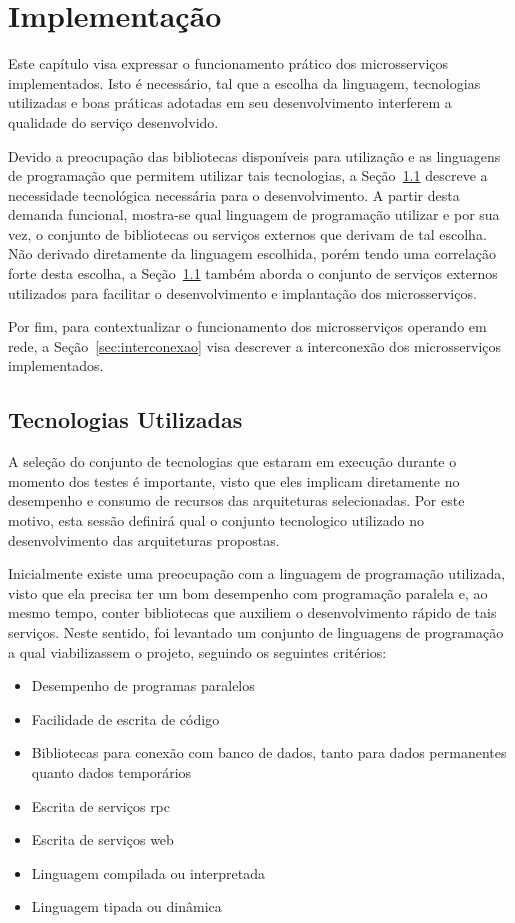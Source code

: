 \chapter{Implementação}
\label{cap5}

Este capítulo visa expressar o funcionamento prático dos microsserviços implementados.
%
Isto é necessário, tal que a escolha da linguagem, tecnologias utilizadas e boas práticas adotadas em seu desenvolvimento interferem a qualidade do serviço desenvolvido.

Devido a preocupação das bibliotecas disponíveis para utilização e as linguagens de programação que permitem utilizar tais tecnologias,
a Seção~\ref{sec:tecnologias} descreve a necessidade tecnológica necessária para o desenvolvimento. A partir desta demanda funcional, mostra-se qual linguagem de programação utilizar e por sua vez, o conjunto de bibliotecas ou serviços externos que derivam de tal escolha.
%
Não derivado diretamente da linguagem escolhida, porém tendo uma correlação forte desta escolha, a Seção~\ref{sec:tecnologias} também aborda o conjunto de serviços externos utilizados para facilitar o desenvolvimento e implantação dos microsserviços.

Por fim, para contextualizar o funcionamento dos microsserviços operando em rede, a Seção~\ref{sec:interconexao} visa descrever a interconexão dos microsserviços implementados.

\section{Tecnologias Utilizadas}
\label{sec:tecnologias}

A seleção do conjunto de tecnologias que estaram em execução durante o momento dos testes é importante, visto que eles implicam diretamente no desempenho e consumo de recursos das arquiteturas selecionadas.
%
Por este motivo, esta sessão definirá qual o conjunto tecnologico utilizado no desenvolvimento das arquiteturas propostas.

Inicialmente existe uma preocupação com a linguagem de programação utilizada, visto que ela precisa ter um bom desempenho com programação paralela e, ao mesmo tempo, conter bibliotecas que auxiliem o desenvolvimento rápido de tais serviços.
%
Neste sentido, foi levantado um conjunto de linguagens de programação a qual viabilizassem o projeto, seguindo os seguintes critérios:

\begin{itemize}
  \item Desempenho de programas paralelos
  \item Facilidade de escrita de código
  \item Bibliotecas para conexão com banco de dados, tanto para dados permanentes quanto dados temporários
  \item Escrita de serviços \ac{rpc}
  \item Escrita de serviços \ac{web}
  \item Linguagem compilada ou interpretada
  \item Linguagem tipada ou dinâmica
\end{itemize}


